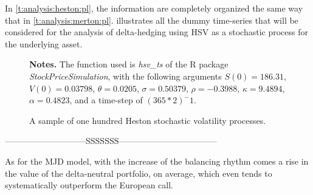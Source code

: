 \documentclass[12pt]{report}
\begin{document}
In \cref{t:analysis:heston:pl}, the information are completely organized the same way that in \cref{t:analysis:merton:pl}. 
 illustrates all the dummy time-series that will be considered for the analysis of delta-hedging using HSV as a stochastic process for the underlying asset.


\begin{figure}[ht]
  \centering
  
  \caption{A sample of one hundred Heston stochastic volatility processes.}
  \begin{changemargin}{0.5cm}{0.5cm}
  \medskip
\footnotesize
{}\textbf{Notes.} The function used is \textit{hsv\_ts} of the R package \textit{StockPriceSimulation}, with the following arguments $S(0) = 186.31$,  $V(0) = 0.03798$, $\theta = 0.0205$, $\sigma = 0.50379$, $\rho = -0.3988$,  $\kappa = 9.4894$, $\alpha  = 0.4823$, and a time-step of $(365 * 2)^-1$.
  \end{changemargin}
  \label{p:analysis:hsv:100}
\end{figure}




-----------------------------SSSSSSS-----------------------------------






As for the MJD model, with the increase of the balancing rhythm comes a rise in the value of the delta-neutral portfolio, on average, which even tends to systematically outperform the European call.
\end{document}
